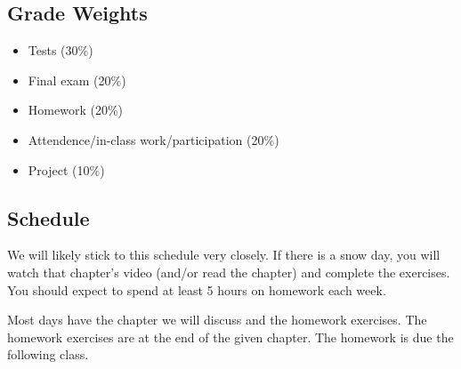 \documentclass[12pt,letterpaper]{article}
\begin{document}
\subsection*{Grade Weights}
\begin{itemize}
\item Tests (30\%)
\item Final exam (20\%)
\item Homework (20\%)
\item Attendence/in-class work/participation (20\%)
\item Project (10\%)
\end{itemize}


\newpage
\subsection*{Schedule}
We will likely stick to this schedule very closely. If there is a snow day, you will watch that chapter's video (and/or read the chapter) and complete the exercises. You should expect to spend at least 5 hours on homework each week. 

Most days have the chapter we will discuss and the homework exercises. The homework exercises are at the end of the given chapter. The homework is due the following class.
\end{document}
